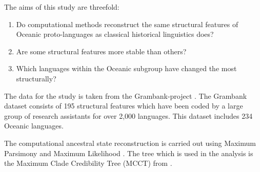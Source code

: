 \documentclass[draft,10pt]{article} %
\begin{document}
The aims of this study are threefold: 

\begin{enumerate}
\item Do computational methods reconstruct the same structural features of Oceanic proto-languages as classical historical linguistics does?
\item Are some structural features more stable than others?
\item Which languages within the Oceanic subgroup have changed the most structurally?
\end{enumerate}




The data for the study is taken from the Grambank-project \citep{grambankwebsite}. The Grambank dataset consists of 195 structural features which have been coded by a large group of research assistants for over 2,000 languages. This dataset includes 234 Oceanic languages. 

The computational ancestral state reconstruction is carried out using Maximum Parsimony \citep{sankoff1975minimal, louca2017efficient} and Maximum Likelihood \citep{fisher1912absolute, wilks1938large, pagel1994detecting, cunningham1998reconstructing, jager2018using}. The tree which is used in the analysis is the Maximum Clade Credibility Tree (MCCT) from  \cite{grayetal_2009}.
\end{document}
